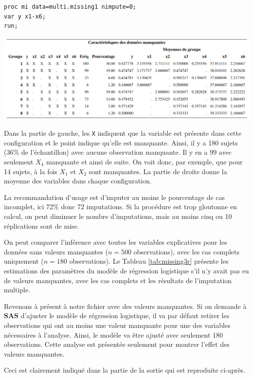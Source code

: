 \documentclass[
  11pt,
  letterpaper,
]{book}
\theoremstyle{definition}
\theoremstyle{definition}
\theoremstyle{definition}
\theoremstyle{remark}
\begin{document}
\begin{verbatim}
proc mi data=multi.missing1 nimpute=0;
var y x1-x6;
run;
\end{verbatim}

\begin{center}\includegraphics[width=1\linewidth]{figures/06-manquantes-e2} \end{center}

Dans la partie de gauche, les \texttt{X} indiquent que la variable est présente dans cette configuration et le point indique qu'elle est manquante. Ainsi, il y a 180 sujets (36\% de l'échantillon) avec aucune observation manquante. Il y en a 99 avec seulement \(X_4\) manquante et ainsi de suite. On voit donc, par exemple, que pour 14 sujets, à la fois \(X_1\) et \(X_2\) sont manquantes. La partie de droite donne la moyenne des variables dans chaque configuration.

La recommandation d'usage est d'imputer au moins le pourcentage de cas incomplet, ici 72\% donc 72 imputations. Si la procédure est trop gloutonne en calcul, on peut diminuer le nombre d'imputations, mais au moins cinq ou 10 réplications sont de mise.

On peut comparer l'inférence avec toutes les variables explicatives pour les données sans valeurs manquantes (\(n=500\) observations), avec les cas complets uniquement (\(n=180\) observations).
Le Tableau \ref{tab:missing3r} présente les estimations des paramètres du modèle de régression logistique s'il n'y avait pas eu de valeurs manquantes, avec les cas complets et les résultats de l'imputation multiple.

Revenons à présent à notre fichier avec des valeurs manquantes. Si on demande à \textbf{SAS} d'ajuster le modèle de régression logistique, il va par défaut retirer les observations qui ont au moins une valeur manquante pour une des variables nécessaires à l'analyse. Ainsi, le modèle va être ajusté avec seulement 180 observations. Cette analyse est présentée seulement pour montrer l'effet des valeurs manquantes.

Ceci est clairement indiqué dans la partie de la sortie qui est reproduite ci-après.
\end{document}
